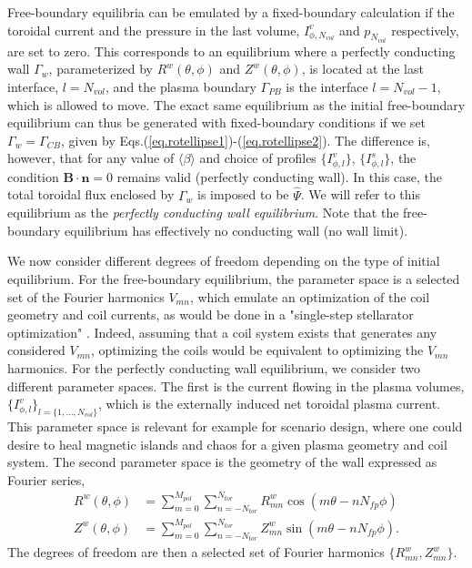 \documentclass[my_thesis.tex]{subfiles}
\begin{document}
Free-boundary equilibria can be emulated by a fixed-boundary calculation if the toroidal current and the pressure in the last volume, $I^v_{\phi,N_{vol}}$ and $p_{N_{vol}}$ respectively, are set to zero. This corresponds to an equilibrium where a perfectly conducting wall $\Gamma_w$, parameterized by $R^w(\theta,\phi)$ and $Z^w(\theta,\phi)$, is located at the last interface, $l=N_{vol}$, and the plasma boundary $\Gamma_{PB}$ is the interface $l=N_{vol}-1$, which is allowed to move. The exact same equilibrium as the initial free-boundary equilibrium can thus be generated with fixed-boundary conditions if we set $\Gamma_w=\Gamma_{CB}$, given by Eqs.(\ref{eq.rotellipse1})-(\ref{eq.rotellipse2}). The difference is, however, that for any value of $\langle\beta\rangle$ and choice of  profiles $\{I^v_{\phi,l}\}$, $\{I^s_{\phi,l}\}$, the condition $\mathbf{B}\cdot\mathbf{n}=0$ remains valid (perfectly conducting wall). In this case, the total toroidal flux enclosed by $\Gamma_w$ is imposed to be $\widehat\Psi$. We will refer to this equilibrium as the \emph{perfectly conducting wall equilibrium}. Note that the free-boundary equilibrium has effectively no conducting wall (no wall limit).

We now consider different degrees of freedom depending on the type of initial equilibrium. 
For the free-boundary equilibrium, the parameter space is a selected set of the Fourier harmonics $V_{mn}$, which emulate an optimization of the coil geometry and coil currents, as would be done in a "single-step stellarator optimization" \cite{Hudson2002,Henneberg2021c}. Indeed, assuming that a coil system exists that generates any considered $V_{mn}$, optimizing the coils would be equivalent to optimizing the $V_{mn}$ harmonics.
For the perfectly conducting wall equilibrium, we consider two different parameter spaces. The first is the current flowing in the plasma volumes, $\{I^v_{\phi,l}\}_{l=\{1,\ldots,N_{vol}\}}$, which is the externally induced net toroidal plasma current. This parameter space is relevant for example for scenario design, where one could desire to heal magnetic islands and chaos for a given plasma geometry and coil system.  
The second parameter space is the geometry of the wall expressed as Fourier series,
\begin{align}
    R^w(\theta,\phi) &= \sum_{m=0}^{M_{pol}}\sum_{n=-N_{tor}}^{N_{tor}}R^w_{mn} \cos(m\theta-n N_{fp}\phi)\\
    Z^w(\theta,\phi) &= \sum_{m=0}^{M_{pol}}\sum_{n=-N_{tor}}^{N_{tor}}Z^w_{mn} \sin(m\theta-n N_{fp}\phi).
\end{align}
The degrees of freedom are then a selected set of Fourier harmonics $\{R^w_{mn},Z^w_{mn}\}$.
\end{document}
